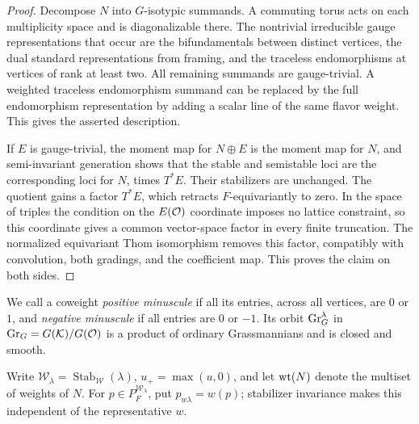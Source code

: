 \begin{proof}
Decompose $N$ into $G$-isotypic summands.  A commuting torus acts on each
multiplicity space and is diagonalizable there.  The nontrivial irreducible
gauge representations that occur are the bifundamentals between distinct
vertices, the dual standard representations from framing, and the
traceless endomorphisms at vertices of rank at least two.  All remaining
summands are gauge-trivial.  A weighted traceless endomorphism summand can
be replaced by the full endomorphism representation by adding a scalar
line of the same flavor weight.  This gives the asserted description.

If $E$ is gauge-trivial, the moment map for $N\oplus E$ is the moment map
for $N$, and semi-invariant generation shows that the stable and
semistable loci are the corresponding loci for $N$, times $T^*E$.
Their stabilizers are unchanged.  The quotient gains a factor $T^*E$,
which retracts $F$-equivariantly to zero.  In the space of triples the
condition on the $E(\mathcal O)$ coordinate imposes no lattice constraint, so
this coordinate gives a common vector-space factor in every finite
truncation.  The normalized equivariant Thom isomorphism removes this
factor, compatibly with convolution, both gradings, and the coefficient
map.  This proves the claim on both sides.
\end{proof}

We call a coweight \emph{positive minuscule} if all its entries, across
all vertices, are $0$ or $1$, and \emph{negative minuscule} if all entries
are $0$ or $-1$.  Its orbit $\operatorname{Gr}_G^\lambda$ in
$\operatorname{Gr}_G=G(\mathcal K)/G(\mathcal O)$ is a product of ordinary Grassmannians and is
closed and smooth.

Write $\mathcal W_\lambda=\operatorname{Stab}_{\mathcal W}(\lambda)$,
$u_+=\max(u,0)$, and let $\operatorname{wt}(N)$ denote the multiset of weights of $N$.
For $p\in P_F^{\mathcal W_\lambda}$, put $p_{w\lambda}=w(p)$; stabilizer
invariance makes this independent of the representative $w$.

